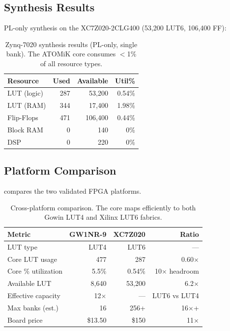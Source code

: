 \documentclass[11pt,letterpaper]{article}
\theoremstyle{plain}
\theoremstyle{definition}
\theoremstyle{remark}
\begin{document}
\subsection{Synthesis Results}

PL-only synthesis on the XC7Z020-2CLG400 (53,200 LUT6, 106,400 FF):

\begin{table}[!htbp]
\centering
\caption{Zynq-7020 synthesis results (PL-only, single bank). The ATOMiK core consumes $<$1\% of all resource types.}
\label{tab:zynq-resources}
\begin{tabular}{@{}lrrr@{}}
\toprule
\textbf{Resource} & \textbf{Used} & \textbf{Available} & \textbf{Util\%} \\
\midrule
LUT (logic) & 287    & 53,200  & 0.54\% \\
LUT (RAM)   & 344    & 17,400  & 1.98\% \\
Flip-Flops  & 471    & 106,400 & 0.44\% \\
Block RAM   & 0      & 140     & 0\% \\
DSP         & 0      & 220     & 0\% \\
\bottomrule
\end{tabular}
\end{table}

\subsection{Platform Comparison}

 compares the two validated FPGA platforms.

\begin{table}[!htbp]
\centering
\caption{Cross-platform comparison. The core maps efficiently to both Gowin LUT4 and Xilinx LUT6 fabrics.}
\label{tab:platform}
\begin{tabular}{@{}lrrr@{}}
\toprule
\textbf{Metric} & \textbf{GW1NR-9} & \textbf{XC7Z020} & \textbf{Ratio} \\
\midrule
LUT type       & LUT4    & LUT6    & --- \\
Core LUT usage & 477     & 287     & 0.60$\times$ \\
Core \% utilization & 5.5\% & 0.54\% & 10$\times$ headroom \\
Available LUT  & 8,640   & 53,200  & 6.2$\times$ \\
Effective capacity & 12$\times$ & --- & LUT6 vs LUT4 \\
Max banks (est.) & 16 & 256+ & 16$\times$+ \\
Board price & \$13.50 & \$150 & 11$\times$ \\
\bottomrule
\end{tabular}
\end{table}
\end{document}
